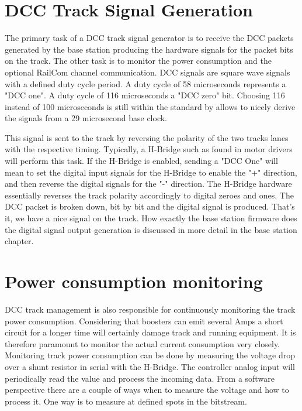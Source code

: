 \section{DCC Track Signal Generation}

The primary task of a DCC track signal generator is to receive the DCC packets generated by the base station producing the hardware signals for the packet bits on the track. The other task is to monitor the power consumption and the optional RailCom channel communication. DCC signals are square wave signals with a defined duty cycle period. A duty cycle of 58 microseconds represents a "DCC one". A duty cycle of 116 microseconds a "DCC zero" bit. Choosing 116 instead of 100 microseconds is still within the standard by allows to nicely derive the signals from a 29 microsecond base clock. 

This signal is sent to the track by reversing the polarity of the two tracks lanes with the respective timing. Typically, a H-Bridge such as found in motor drivers will perform this task. If the H-Bridge is enabled, sending a "DCC One" will mean to set the digital input signals for the H-Bridge to enable the "+" direction, and then reverse the digital signals for the "-" direction. The H-Bridge hardware essentially reverses the track polarity accordingly to digital zeroes and ones. The DCC packet is broken down, bit by bit and the digital signal is produced.  That's it, we have a nice signal on the track. How exactly the base station firmware does the digital signal output generation is discussed in more detail in the base station chapter.

\section{Power consumption monitoring}

DCC track management is also responsible for continuously monitoring the track power consumption. Considering that boosters can emit several Amps a short circuit for a longer time will certainly damage track and running equipment. It is therefore paramount to monitor the actual current consumption very closely. Monitoring track power consumption can be done by measuring the voltage drop over a shunt resistor in serial with the H-Bridge. The controller analog input will periodically read the value and process the incoming data. From a software perspective there are a couple of ways when to measure the voltage and how to process it. One way is to measure at defined spots in the bitstream.

